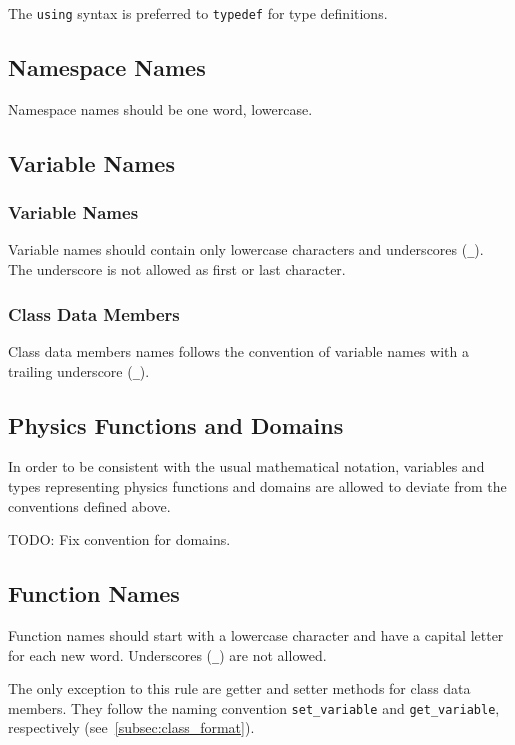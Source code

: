 \documentclass[a4paper]{article}
\newcommand{\inlinecode}[1]{\lstinline|#1|}
\begin{document}
The \inlinecode{using} syntax is preferred to \inlinecode{typedef} for type definitions.

\subsection{Namespace Names}

Namespace names should be one word, lowercase.

\subsection{Variable Names}

\subsubsection{Variable Names}

Variable names should contain only lowercase characters and underscores (\inlinecode{_}).
The underscore is not allowed as first or last character.

\subsubsection{Class Data Members}

Class data members names follows the convention of variable names with a trailing underscore (\inlinecode{_}).

\subsection{Physics Functions and Domains}

In order to be consistent with the usual mathematical notation, variables and types representing physics functions and domains are allowed to deviate from the conventions defined above.

TODO: Fix convention for domains.

\subsection{Function Names}

Function names should start with a lowercase character and have a capital letter for each new word.
Underscores (\inlinecode{_}) are not allowed.

The only exception to this rule are getter and setter methods for class data members.
They follow the naming convention \inlinecode{set_variable} and \inlinecode{get_variable}, respectively (see~\ref{subsec:class_format}).
\end{document}
